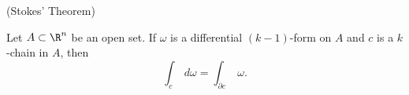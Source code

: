 \documentclass{book}
\begin{document}
\begin{theorem}
(Stokes' Theorem)

Let $A\subset\R^n$ be an open set.  If $\omega$ is a differential $(k-1)$-form on $A$
and $c$ is a $k$-chain in $A$, then $$\int_c\; d\omega=\int_{\partial c}\;\omega.$$
\end{theorem}

\end{document}
